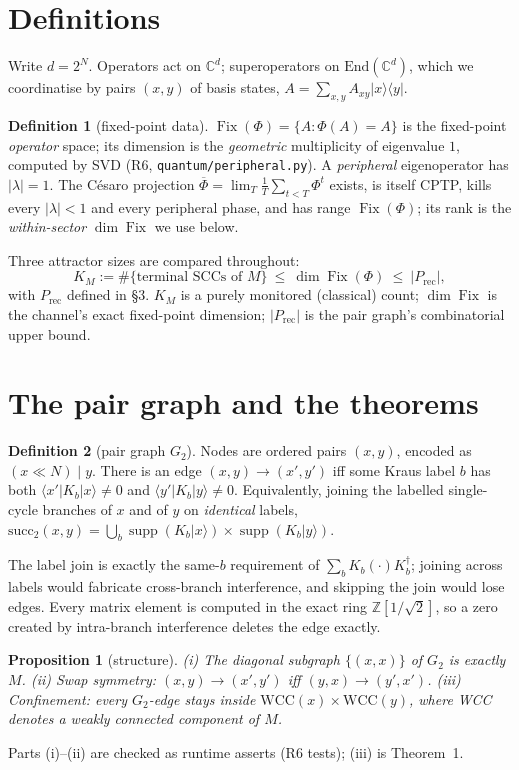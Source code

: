 \documentclass[11pt]{article}
\newcommand{\fn}[1]{\texttt{#1}}
\providecommand{\ket}[1]{|#1\rangle}
\providecommand{\bra}[1]{\langle #1|}
\newcommand{\Fix}{\operatorname{Fix}}
\newcommand{\supp}{\operatorname{supp}}
\newcommand{\Prec}{P_{\mathrm{rec}}}
\newcommand{\GG}{G_2}
\theoremstyle{plain}
\newtheorem{proposition}{Proposition}
\theoremstyle{definition}
\newtheorem{definition}{Definition}
\begin{document}
\section{Definitions}
Write $d=2^N$. Operators act on $\mathbb{C}^{d}$; superoperators on
$\mathrm{End}(\mathbb{C}^d)$, which we coordinatise by pairs $(x,y)$ of basis
states, $A=\sum_{x,y}A_{xy}\ket{x}\bra{y}$.
\begin{definition}[fixed-point data]
$\Fix(\Phi)=\{A:\Phi(A)=A\}$ is the fixed-point \emph{operator} space; its
dimension is the \emph{geometric} multiplicity of eigenvalue $1$, computed by
SVD (R6, \fn{quantum/peripheral.py}). A \emph{peripheral} eigenoperator has
$|\lambda|=1$. The C\'esaro projection
$\overline{\Phi}=\lim_{T}\frac1T\sum_{t<T}\Phi^t$ exists, is itself CPTP, kills
every $|\lambda|<1$ and every peripheral phase, and has range $\Fix(\Phi)$; its
rank is the \emph{within-sector} $\dim\Fix$ we use below.
\end{definition}
Three attractor sizes are compared throughout:
\[
  K_M := \#\{\text{terminal SCCs of }M\}\ \le\
  \dim\Fix(\Phi)\ \le\ |\Prec|,
\]
with $\Prec$ defined in \S3. $K_M$ is a purely monitored (classical) count;
$\dim\Fix$ is the channel's exact fixed-point dimension; $|\Prec|$ is the pair
graph's combinatorial upper bound.

\section{The pair graph and the theorems}
\begin{definition}[pair graph $\GG$]
Nodes are ordered pairs $(x,y)$, encoded as $(x\ll N)\mid y$. There is an edge
$(x,y)\to(x',y')$ iff some Kraus label $b$ has both $\bra{x'}K_b\ket{x}\neq 0$
and $\bra{y'}K_b\ket{y}\neq 0$. Equivalently, joining the labelled single-cycle
branches of $x$ and of $y$ on \emph{identical} labels,
$\mathrm{succ}_2(x,y)=\bigcup_{b}\supp(K_b\ket{x})\times\supp(K_b\ket{y})$.
\end{definition}
The label join is exactly the same-$b$ requirement of $\sum_b K_b(\cdot)K_b^\dagger$;
joining across labels would fabricate cross-branch interference, and skipping the
join would lose edges. Every matrix element is computed in the exact ring
$\mathbb{Z}[1/\sqrt2]$, so a zero created by intra-branch interference deletes the
edge exactly.

\begin{proposition}[structure]\label{prop:struct}
(i) The diagonal subgraph $\{(x,x)\}$ of $\GG$ is exactly $M$.
(ii) Swap symmetry: $(x,y)\to(x',y')$ iff $(y,x)\to(y',x')$.
(iii) Confinement: every $\GG$-edge stays inside
$\mathrm{WCC}(x)\times\mathrm{WCC}(y)$, where WCC denotes a weakly connected
component of $M$.
\end{proposition}
Parts (i)--(ii) are checked as runtime asserts (R6 tests); (iii) is Theorem~1.
\end{document}
